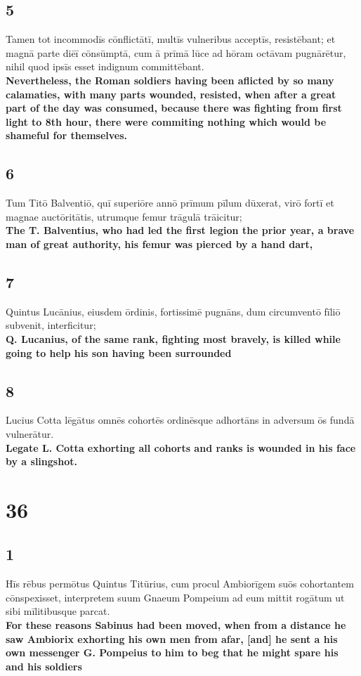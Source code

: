 \documentclass{article}
\begin{document}
\subsection*{5}
Tamen tot incommodīs cōnflictātī, multīs vulneribus acceptīs, resistēbant; et magnā parte diēī cōnsūmptā, cum ā prīmā lūce ad hōram octāvam pugnārētur, nihil quod ipsīs esset indignum committēbant.\\
\textbf{Nevertheless, the Roman soldiers having been aflicted by so many calamaties, with many parts wounded, resisted, when after a great part of the day was consumed, because there was fighting from first light to 8th hour, there were commiting nothing which would be shameful for themselves. }

\subsection*{6}
Tum Titō Balventiō, quī superiōre annō prīmum pīlum dūxerat, virō fortī et magnae auctōritātis, utrumque femur trāgulā trāicitur; \\
\textbf{The T. Balventius, who had led the first legion the prior year, a brave man of great authority, his femur was pierced by a hand dart,}

\subsection*{7}
Quintus Lucānius, eiusdem ōrdinis, fortissimē pugnāns, dum circumventō fīliō subvenit, interficitur; \\
\textbf{Q. Lucanius, of the same rank, fighting most bravely, is killed while going to help his son having been surrounded}

\subsection*{8}
Lucius Cotta lēgātus omnēs cohortēs ordinēsque adhortāns in adversum ōs fundā vulnerātur.\\
\textbf{Legate L. Cotta exhorting all cohorts and ranks is wounded in his face by a slingshot.}

\section*{36}
\subsection*{1}
Hīs rēbus permōtus Quintus Titūrius, cum procul Ambiorīgem suōs cohortantem cōnspexisset, interpretem suum Gnaeum Pompeium ad eum mittit rogātum ut sibi mīlitibusque parcat.  \\ 
\textbf{For these reasons Sabinus had been moved, when from a distance he saw Ambiorix exhorting his own men from afar, [and] he sent a his own messenger G. Pompeius to him to beg that he might spare his and his soldiers}
\end{document}
